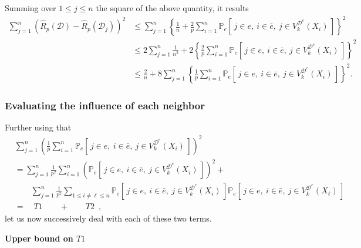 \documentclass[twoside,11pt]{article}
\numberwithin{equation}{section}
\newcommand{\gp}[1]{\left(#1\right)}
\newcommand{\ga}[1]{\left\{#1\right\}}
\newcommand{\1}{\mathds{1}}%
\newcommand{\paren}[1]{\left( #1 \right)}
\newcommand{\croch}[1]{\left[\, #1 \,\right]}
\renewcommand{\P}{\mathbb{P}}
\newcommand{\Rh}{\widehat{R}}
\newcommand{\Rhp}{\Rh_p}
\newcommand{\D}{\mathcal{D}}
\numberwithin{equation}{section}
\theoremstyle{plain}
\begin{document}
Summing over $1\leq j\leq n$ the square of the above quantity, it results
\begin{align*}
 \sum_{j=1}^{n}\gp{  \Rh_p( \D )- \Rhp\paren{\D_j}  }^2
&\leq  \sum_{j=1}^{n}\ga{ \frac{1}{n}+\frac{2}{p} \sum_{i=1}^n \P_e\croch{j\in e,\ i\in \bar e,\ j \in V_k^{\D^e}(X_i) } }^2 \\
%
&\leq 2 \sum_{j=1}^{n} \frac{1}{n^2} + 2\ga{ \frac{2}{p} \sum_{i=1}^n \P_e\croch{j\in e,\ i\in \bar e,\ j \in V_k^{\D^e}(X_i) } }^2\nonumber\\
%
&\leq \frac{2}{n} + 8 \sum_{j=1}^{n}\ga{ \frac{1}{p} \sum_{i=1}^n \P_e\croch{j\in e,\ i\in \bar e,\ j \in V_k^{\D^e}(X_i) } }^2 \nonumber .
\end{align*}
%




\subsubsection{Evaluating the influence of each neighbor}


Further using that
\begin{align*}
& \sum_{j=1}^n \paren{ \frac{1}{p} \sum_{i=1}^n \P_e\croch{j\in e,\ i\in \bar e,\ j \in V_k^{\D^e}(X_i) } }^2 \\
%
& = \sum_{j=1}^n \frac{1}{p^2}\sum_{i=1}^n \paren{ \P_e\croch{j\in e,\ i\in \bar e,\ j \in V_k^{\D^e}(X_i) } }^2 + \\
& \qquad \sum_{j=1}^n \frac{1}{p^2} \sum_{1\leq i\neq \ell \leq n} \P_e\croch{j\in e,\ i\in \bar e,\ j \in V_k^{\D^e}(X_i) }\P_e\croch{j\in e,\ i\in \bar e,\ j \in V_k^{\D^e}(X_{\ell}) } \\
%
& = \quad T1 \qquad + \qquad T2\enspace ,
\end{align*}
let us now successively deal with each of these two terms.


\noindent\textbf{Upper bound on $T1$}
%
\end{document}
